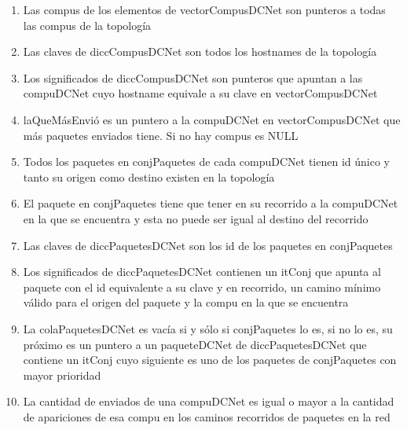 \begin{enumerate}
	\item Las compus de los elementos de vectorCompusDCNet son punteros a todas las compus de
		la topología
	\item Las claves de diccCompusDCNet son todos los hostnames de la topología
	\item Los significados de diccCompusDCNet son punteros que apuntan a las
		compuDCNet cuyo hostname equivale a su clave en vectorCompusDCNet
	\item laQueMásEnvió es un puntero a la compuDCNet en vectorCompusDCNet que
		más paquetes enviados tiene. Si no hay compus es NULL
	\item Todos los paquetes en conjPaquetes de cada compuDCNet tienen id único
		y tanto su origen como destino existen en la topología
	\item El paquete en conjPaquetes tiene que tener en su recorrido a la
		compuDCNet en la que se encuentra y esta no puede ser igual al
		destino del recorrido
	\item Las claves de diccPaquetesDCNet son los id de los paquetes en
		conjPaquetes 
	\item Los significados de diccPaquetesDCNet contienen un itConj que apunta al
		paquete con el id equivalente a su clave y en recorrido, un camino
		mínimo válido para el origen del paquete y la compu en la que se
		encuentra
	\item La colaPaquetesDCNet es vacía si y sólo si conjPaquetes lo es, si no
		lo es, su próximo es un puntero a un paqueteDCNet de diccPaquetesDCNet que contiene un itConj cuyo siguiente
		es uno de los paquetes de conjPaquetes con mayor prioridad
	\item La cantidad de enviados de una compuDCNet es igual o mayor a la
		cantidad de apariciones de esa compu en los caminos recorridos de
		paquetes en la red
\end{enumerate}

